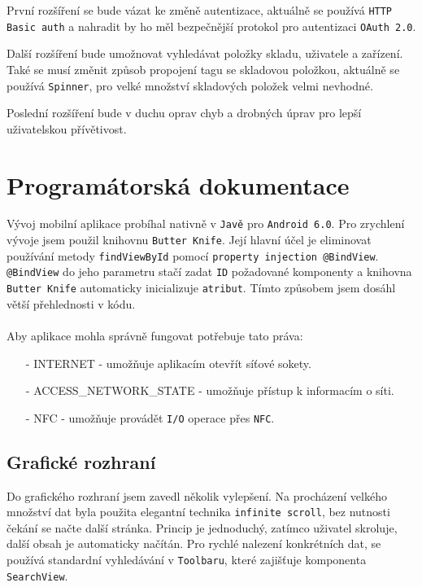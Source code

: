 \documentclass[12pt]{report}
\begin{document}
První rozšíření se bude vázat ke změně autentizace, aktuálně se používá \texttt{HTTP Basic auth} a nahradit by ho měl bezpečnější protokol pro autentizaci \texttt{OAuth 2.0}.

Další rozšíření bude umožnovat vyhledávat položky skladu, uživatele a zařízení.
Také se musí změnit způsob propojení tagu se skladovou položkou, aktuálně se používá \texttt{Spinner}, pro velké množství skladových položek velmi nevhodné.  

Poslední rozšíření bude v duchu oprav chyb a drobných úprav pro lepší uživatelskou přívětivost.  


\chapter{Programátorská dokumentace}
	Vývoj mobilní aplikace probíhal nativně v \texttt{Javě} pro \texttt{Android 6.0}.
	Pro zrychlení vývoje jsem použil knihovnu \texttt{Butter Knife}. Její hlavní účel je eliminovat používání metody \texttt{findViewById} pomocí \texttt{property injection @BindView}.
	\texttt{@BindView} do jeho parametru stačí zadat \texttt{ID} požadované komponenty a knihovna \texttt{Butter Knife} automaticky inicializuje \texttt{atribut}. Tímto způsobem jsem dosáhl větší přehlednosti v kódu.
\\\\
Aby aplikace mohla správně fungovat potřebuje tato práva:
\begin{itemize}[noitemsep]
\item [-] INTERNET - umožňuje aplikacím otevřít síťové sokety.
\item [-] ACCESS\_NETWORK\_STATE - umožňuje přístup k informacím o síti.
\item [-] NFC - umožňuje provádět \texttt{I/O} operace přes \texttt{NFC}.
\end{itemize}	
		
\section{Grafické rozhraní}
Do grafického rozhraní jsem zavedl několik vylepšení. Na procházení velkého množství dat byla použita elegantní technika \texttt{infinite scroll}, bez nutnosti čekání se načte další stránka. Princip je jednoduchý, zatímco uživatel skroluje, další obsah je automaticky načítán. Pro rychlé nalezení konkrétních dat, se používá standardní vyhledávání v \texttt{Toolbaru}, které zajišťuje komponenta \texttt{SearchView}.
				
\end{document}
